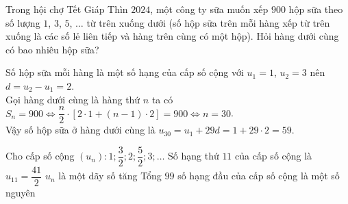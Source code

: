 \begin{ex}%
    Trong hội chợ Tết Giáp Thìn $2024$, một công ty sữa muốn xếp $900$ hộp sữa theo số lượng $1$, $3$, $5$, $\ldots$ từ trên xuống dưới (số hộp sữa trên mỗi hàng xếp từ trên xuống là các số lẻ liên tiếp và hàng trên cùng có một hộp). Hỏi hàng dưới cùng có bao nhiêu hộp sữa?
    \loigiai
    {Số hộp sữa mỗi hàng là một số hạng của cấp số cộng với $u_1=1$, $u_2=3$ nên $d=u_2-u_1=2$.\\
        Gọi hàng dưới cùng là hàng thứ $n$ ta có $S_n=900\Leftrightarrow \dfrac{n}{2}\cdot \left[2\cdot 1+(n-1)\cdot 2\right]=900\Leftrightarrow n=30$.\\
        Vậy số hộp sữa ở hàng dưới cùng là $u_{30}=u_1+29d=1+29\cdot 2=59$. 
        
    }
\end{ex}

\begin{ex}%
	Cho cấp số cộng $\left(u_n\right)\colon 1; \dfrac{3}{2}; 2; \dfrac{5}{2}; 3; \ldots$
	{Số hạng thứ $11$ của cấp số cộng là $u_{11}=\dfrac{41}{2}$}
	{\True $u_n$ là một dãy số tăng}
	{Tổng $99$ số hạng đầu của cấp số cộng là một số nguyên}
\end{ex}


